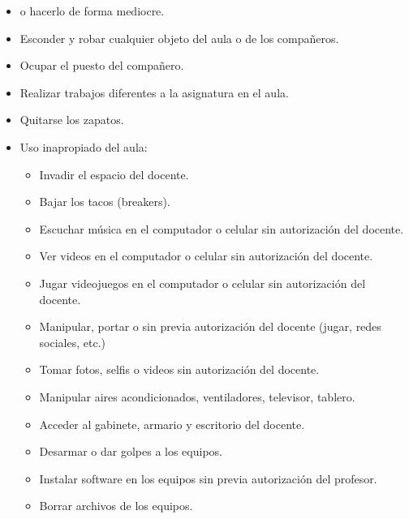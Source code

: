 \documentclass[letterpaper,10pt,spanish]{sphinxmanual}
\begin{document}
\begin{itemize}
\item {} 
\sphinxAtStartPar
{} o hacerlo de forma mediocre.

\item {} 
\sphinxAtStartPar
Esconder y robar cualquier objeto del aula o de los compañeros.

\item {} 
\sphinxAtStartPar
Ocupar el puesto del compañero.

\item {} 
\sphinxAtStartPar
Realizar trabajos diferentes a la asignatura en el aula.

\item {} 
\sphinxAtStartPar
Quitarse los zapatos.

\item {} 
\sphinxAtStartPar
Uso inapropiado del aula:
\begin{itemize}
\item {} 
\sphinxAtStartPar
Invadir el espacio del docente.

\item {} 
\sphinxAtStartPar
Bajar los tacos (breakers).

\item {} 
\sphinxAtStartPar
Escuchar música en el computador o celular sin autorización del docente.

\item {} 
\sphinxAtStartPar
Ver videos en el computador o celular sin autorización del docente.

\item {} 
\sphinxAtStartPar
Jugar videojuegos en el computador o celular sin autorización del docente.

\item {} 
\sphinxAtStartPar
Manipular, portar o  sin previa autorización del docente (jugar, redes sociales, etc.)

\item {} 
\sphinxAtStartPar
Tomar fotos, selfis o videos sin autorización del docente.

\item {} 
\sphinxAtStartPar
Manipular aires acondicionados, ventiladores, televisor, tablero.

\item {} 
\sphinxAtStartPar
Acceder al gabinete, armario y escritorio del docente.

\item {} 
\sphinxAtStartPar
Desarmar o dar golpes a los equipos.

\item {} 
\sphinxAtStartPar
Instalar software en los equipos sin previa autorización del profesor.

\item {} 
\sphinxAtStartPar
Borrar archivos de los equipos.

\end{itemize}

\end{itemize}
\end{document}
